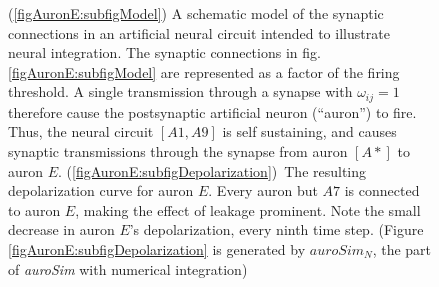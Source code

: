 \begin{figure}[hbt!p]
    \centering
    \caption[An artificial neural circuit to illustrate numerical integration of the $LIF$ neuron. Schematic model and simulation results.]{
			(\ref{figAuronE:subfigModel}) A schematic model of the synaptic connections in an artificial neural circuit intended to illustrate neural integration.
			The synaptic connections in fig. \ref{figAuronE:subfigModel} are represented as a factor of the firing threshold.
			A single transmission through a synapse with $\omega_{ij}=1$ therefore cause the postsynaptic artificial neuron (``auron'') to fire.
			Thus, the neural circuit $[A1, A9]$ is self sustaining, and causes synaptic transmissions through the synapse from auron $[A*]$ to auron $E$.
			\mbox{(\ref{figAuronE:subfigDepolarization}) The} resulting depolarization curve for auron $E$.
			Every auron but $A7$ is connected to auron $E$, making the effect of leakage prominent.
			Note the small decrease in auron $E$'s depolarization, every ninth time step.
			(Figure \ref{figAuronE:subfigDepolarization} is generated by $auroSim_{N}$, the part of \emph{auroSim} with numerical integration) \cite{FDP_report}
				}
\end{figure}



		
